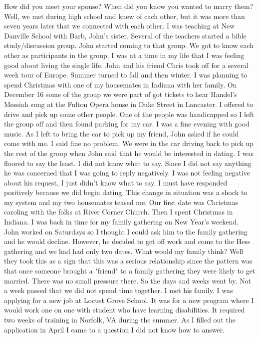 How did you meet your spouse? When did you know you wanted to marry them?
Well, we met during high school and knew of each other, but it was more than seven years later that we connected with each other.
I was teaching at New Danville School with Barb, John's sister.
Several of the teachers started a bible study/discussion group.
John started coming to that group.
We got to know each other as participants in the group.
I was at a time in my life that I was feeling good about living the single life.
John and his friend Chris took off for a several week tour of Europe.
Summer turned to fall and then winter.
I was planning to spend Christmas with one of my housemates in Indiana with her family.
On December 16 some of the group we were part of got tickets to hear Handel's Messiah sung at the Fulton Opera house in Duke Street in Lancaster.
I offered to drive and pick up some other people.
One of the people was handicapped so I left the group off and then found parking for my car.
I was a fine evening with good music.
As I left to bring the car to pick up my friend, John asked if he could come with me.
I said fine no problem.
We were in the car driving back to pick up the rest of the group when John said that he would be interested in dating.
I was floored to say the least.
I did not know what to say.
Since I did not say anything he was concerned that I was going to reply negatively.
I was not feeling negative about his request, I just didn't know what to say.
I must have responded positively because we did begin dating.
This change in situation was a shock to my system and my two housemates teased me.
Our first date was Christmas caroling with the folks at River Corner Church.
Then I spent Christmas in Indiana.
I was back in time for my family gathering on New Year's weekend.
John worked on Saturdays so I thought I could ask him to the family gathering and he would decline.
However, he decided to get off work and come to the Hess gathering and we had had only two dates.
What would my family think?
Well they took this as a sign that this was a serious relationship since the pattern was that once someone brought a "friend" to a family gathering they were likely to get married.
There was no small pressure there.
So the days and weeks went by.
Not a week passed that we did not spend time together.
I met his family.
I was applying for a new job at Locust Grove School.
It was for a new program where I would work one on one with student who have learning disabilities.
It required two weeks of training in Norfolk, VA during the summer.
As I filled out the application in April I came to a question I did not know how to answer.
